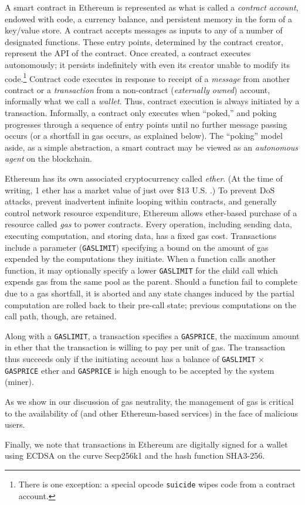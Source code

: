 A smart contract in Ethereum is represented as what is called a \emph{contract account}, endowed with code, a currency balance, and persistent memory in the form of a key/value store. A contract accepts messages as inputs to any of a number of designated functions. These entry points, determined by the contract creator, represent the API of the contract. Once created, a contract executes autonomously; it persists indefinitely with even its creator unable to modify its code.\footnote{There is one exception: a special opcode \texttt{suicide} wipes code from a contract account.} Contract code executes in response to receipt of a \emph{message} from another contract or a \emph{transaction} from a non-contract (\emph{externally owned}) account, informally what we call a \emph{wallet}. Thus, contract execution is always initiated by a transaction. Informally, a contract only executes when ``poked,'' and poking progresses through a sequence of entry points until no further message passing occurs (or a shortfall in gas occurs, as explained below). The ``poking'' model aside, as a simple abstraction, a smart contract may be viewed as an {\em autonomous agent} on the blockchain.

Ethereum has its own associated cryptocurrency called \emph{ether}. (At the time of writing, 1 ether has a market value of just over \$13 U.S. \cite{ethprice}.)
To prevent DoS attacks, prevent inadvertent infinite looping within contracts, and generally control network resource expenditure,
Ethereum allows ether-based purchase of a resource called \emph{gas} to power contracts.
Every operation, including sending data, executing computation, and storing data, has a fixed gas cost.
Transactions include a parameter (\texttt{GASLIMIT}) specifying a bound on the amount of gas expended by the computations they initiate.
When a function calls another function, it may optionally specify a lower \texttt{GASLIMIT} for the child call which expends gas from the same pool as the parent.
Should a function fail to complete due to a gas shortfall,
it is aborted and any state changes induced by the partial computation are rolled back to their pre-call state;
previous computations on the call path, though, are retained.

Along with a \texttt{GASLIMIT}, a transaction specifies a \texttt{GASPRICE}, the maximum amount in ether that the transaction is willing to pay per unit of gas. The transaction thus succeeds only if the initiating account has a balance of \texttt{GASLIMIT} $\times$ \texttt{GASPRICE} ether and \texttt{GASPRICE} is high enough to be accepted by the system (miner). 

As we show in our discussion of gas neutrality, the management of gas is critical to the availability of \tc (and other Ethereum-based services) in the face of malicious users.

Finally, we note that transactions in Ethereum are digitally signed for a wallet using ECDSA on the curve Secp256k1 and the hash function SHA3-256.



